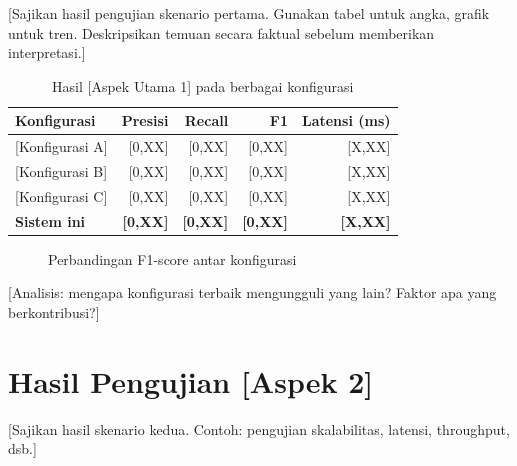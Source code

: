 [Sajikan hasil pengujian skenario pertama. Gunakan tabel untuk angka, grafik untuk tren.
Deskripsikan temuan secara faktual sebelum memberikan interpretasi.]

\begin{table}[H]
  \centering
  \caption{Hasil [Aspek Utama 1] pada berbagai konfigurasi}
  \label{tab:6.hasil1}
  \begin{tabular}{lrrrr}
    \toprule
    \textbf{Konfigurasi} & \textbf{Presisi} & \textbf{Recall} & \textbf{F1} & \textbf{Latensi (ms)} \\
    \midrule
    {[Konfigurasi A]} & [0,XX] & [0,XX] & [0,XX] & [X,XX] \\
    {[Konfigurasi B]} & [0,XX] & [0,XX] & [0,XX] & [X,XX] \\
    {[Konfigurasi C]} & [0,XX] & [0,XX] & [0,XX] & [X,XX] \\
    \textbf{Sistem ini} & \textbf{[0,XX]} & \textbf{[0,XX]} & \textbf{[0,XX]} & \textbf{[X,XX]} \\
    \bottomrule
  \end{tabular}
\end{table}

\begin{figure}[H]
  \centering
  \caption{Perbandingan F1-score antar konfigurasi}
  \label{fig:6.f1}
\end{figure}

[Analisis: mengapa konfigurasi terbaik mengungguli yang lain? Faktor apa yang berkontribusi?]

\section{Hasil Pengujian [Aspek 2]}
\label{sec:6.3}

[Sajikan hasil skenario kedua. Contoh: pengujian skalabilitas, latensi, throughput, dsb.]

